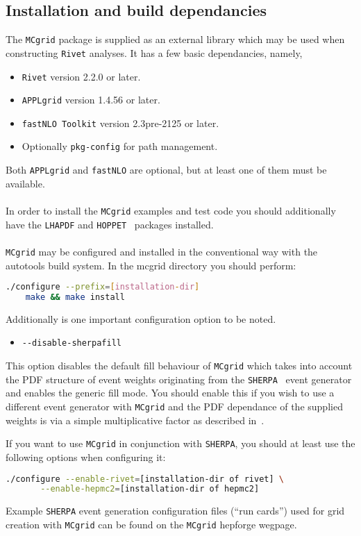 \documentclass[11pt]{article}
\newcommand{\mcgrid} {{\tt MCgrid}\xspace}
\newcommand{\rivet} {{\tt Rivet}\xspace}
\newcommand{\appl} {{\tt APPLgrid}\xspace}
\newcommand{\fnlo} {{\tt fastNLO}\xspace}
\newcommand{\sherpa} {{\tt SHERPA}\xspace}
\begin{document}
\subsection{Installation and build dependancies}
The \mcgrid package is supplied as an external library which may be used when constructing \rivet analyses. It has a few basic dependancies, namely,
\begin{itemize}
\item \rivet version 2.2.0 or later.
\item \appl version 1.4.56 or later.
\item \fnlo\ {\tt Toolkit} version 2.3pre-2125 or later.
\item Optionally {\tt pkg-config} for path management.
\end{itemize}
Both \appl and \fnlo are optional, but at least one of them must be available.
\\\\
In order to install the \mcgrid examples and test code you should additionally have the {\tt LHAPDF} and {\tt HOPPET}~\cite{Salam:2008qg} packages installed. 
\\\\
\mcgrid may be configured and installed in the conventional way with the autotools build system. In the mcgrid directory you should perform:
\begin{lstlisting}[language=bash]
	./configure --prefix=[installation-dir]
	make && make install
\end{lstlisting}
Additionally is one important configuration option to be noted.
\begin{itemize}
\item \lstinline[language=bash]{--disable-sherpafill }
\end{itemize}
This option disables the default fill behaviour of \mcgrid which takes into account the PDF structure of event weights originating from the \sherpa~\cite{Gleisberg:2008ta} event generator and enables the generic fill mode. You should enable this if you wish to use a different event generator with \mcgrid and the PDF dependance of the supplied weights is via a simple multiplicative factor as described in~\cite{cpc}.

If you want to use \mcgrid in conjunction with \sherpa,
you should at least use the following options when configuring it:
\begin{lstlisting}[language=bash]
	./configure --enable-rivet=[installation-dir of rivet] \
	   --enable-hepmc2=[installation-dir of hepmc2]
\end{lstlisting}
Example \sherpa event generation configuration files (``run cards'')
used for grid creation with \mcgrid can be found on the \mcgrid hepforge wegpage.
\end{document}
